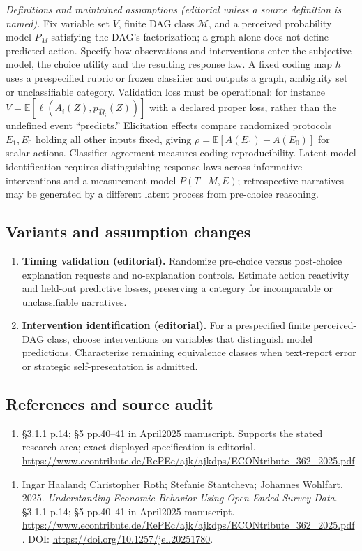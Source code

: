 \documentclass[11pt,a4paper]{article}
\begin{document}
\emph{Definitions and maintained assumptions (editorial unless a source definition is named).} Fix variable set \(V\), finite DAG class \(\mathcal M\), and a perceived probability model \(P_M\) satisfying the DAG’s factorization; a graph alone does not define predicted action. Specify how observations and interventions enter the subjective model, the choice utility and the resulting response law. A fixed coding map \(h\) uses a prespecified rubric or frozen classifier and outputs a graph, ambiguity set or unclassifiable category. Validation loss must be operational: for instance \(V=\mathbb E[\ell(A_i(Z),p_{\widehat M_i}(Z))]\) with a declared proper loss, rather than the undefined event ``predicts.'' Elicitation effects compare randomized protocols \(E_1,E_0\) holding all other inputs fixed, giving \(\rho=\mathbb E[A(E_1)-A(E_0)]\) for scalar actions. Classifier agreement measures coding reproducibility. Latent-model identification requires distinguishing response laws across informative interventions and a measurement model \(P(T\mid M,E)\); retrospective narratives may be generated by a different latent process from pre-choice reasoning.
\subsection*{Variants and assumption changes}
\begin{enumerate}
\item \textbf{Timing validation (editorial).} Randomize pre-choice versus post-choice explanation requests and no-explanation controls. Estimate action reactivity and held-out predictive losses, preserving a category for incomparable or unclassifiable narratives.
\item \textbf{Intervention identification (editorial).} For a prespecified finite perceived-DAG class, choose interventions on variables that distinguish model predictions. Characterize remaining equivalence classes when text-report error or strategic self-presentation is admitted.
\end{enumerate}
\subsection*{References and source audit}
\begin{enumerate}
\item §3.1.1 p.14; §5 pp.40–41 in April2025 manuscript. Supports the stated research area; exact displayed specification is editorial. \url{https://www.econtribute.de/RePEc/ajk/ajkdps/ECONtribute_362_2025.pdf}
\end{enumerate}
\begin{enumerate}\raggedright
\item\hypertarget{definitions:source:30007586:1}{} Ingar Haaland; Christopher Roth; Stefanie Stantcheva; Johannes Wohlfart. 2025. \emph{Understanding Economic Behavior Using Open-Ended Survey Data}. §3.1.1 p.14; §5 pp.40–41 in April2025 manuscript.
\url{https://www.econtribute.de/RePEc/ajk/ajkdps/ECONtribute_362_2025.pdf}.
DOI: \url{https://doi.org/10.1257/jel.20251780}.
\end{enumerate}
\end{document}
